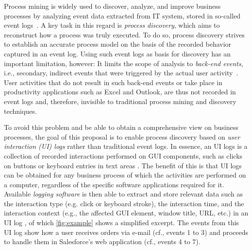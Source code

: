 \label{sec:startingpoint}

\vspace{-1em}

Process mining is widely used to discover, analyze, and improve business processes 
by analyzing event data extracted from IT system, stored in so-called event logs~\cite{van2016data}.
A key task in this regard is \emph{process discovery}, which aims to reconstruct how a process was truly executed. To do so, process discovery strives to establish an accurate process model on the basis of the recorded behavior captured in an event log.
Using such event logs as basis for discovery has an important limitation, however: It limits the scope of analysis to \textit{back-end events}, i.e., secondary, indirect events that were triggered by the actual user activity~\cite{diba2020extraction}. User activities that do not result in such back-end events or take place in productivity applications such as Excel and Outlook, are thus not recorded in event logs and, therefore, invisible to traditional process mining and discovery techniques. 

To avoid this problem and be able to obtain a comprehensive view on business processes, the goal of this proposal is to enable
process discovery based on \textit{user interaction (UI) logs} rather than traditional event logs. In essence, an UI logs is a collection of recorded interactions performed on GUI components, such as clicks on buttons or keyboard entries in text areas \cite{Urabe21}. The benefit of this is that UI logs
can be obtained for any business process of which the activities are performed on a computer, regardless of the specific software applications required for it.
Available \textit{logging software} is then able to extract and store relevant data such as the interaction type (e.g. click or keyboard stroke), the interaction time, and the interaction context (e.g., the affected GUI element, window title, URL, etc.) in an UI log  \cite{leno2019action}, of which 
\autoref{fig:example} shows a simplified excerpt.
The events from this UI log show how a user receives orders via e-mail (cf., events 1 to 3) and proceeds to handle them in Salesforce's web application (cf., events 4 to 7).


